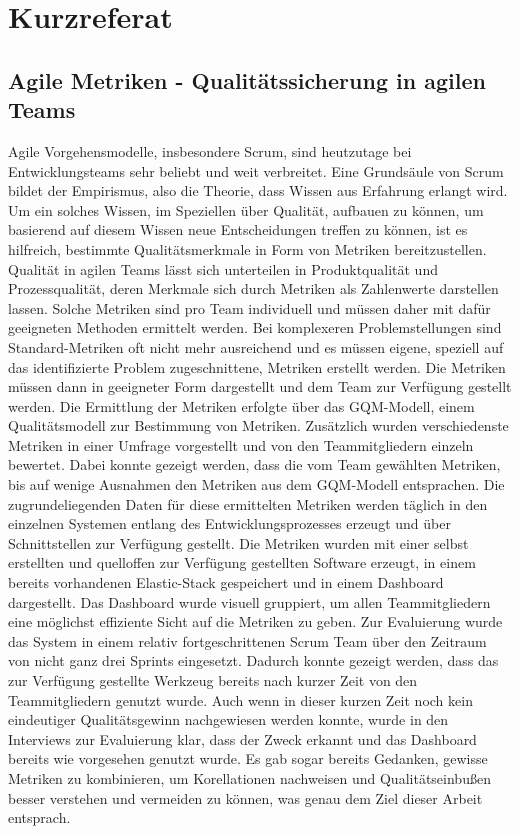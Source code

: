 \newpage
\chapter*{Kurzreferat}
\section*{Agile Metriken {-} Qualitätssicherung in agilen Teams}

Agile Vorgehensmodelle, insbesondere Scrum, sind heutzutage bei Entwicklungsteams sehr beliebt und weit verbreitet.
Eine Grundsäule von Scrum bildet der Empirismus, also die Theorie, dass Wissen aus Erfahrung erlangt wird.
Um ein solches Wissen, im Speziellen über Qualität, aufbauen zu können, um basierend auf diesem Wissen neue Entscheidungen treffen zu können, ist es hilfreich, bestimmte Qualitätsmerkmale in Form von Metriken bereitzustellen.
Qualität in agilen Teams lässt sich unterteilen in Produktqualität und Prozessqualität, deren Merkmale sich durch Metriken als Zahlenwerte darstellen lassen.
Solche Metriken sind pro Team individuell und müssen daher mit dafür geeigneten Methoden ermittelt werden.
Bei komplexeren Problemstellungen sind Standard-Metriken oft nicht mehr ausreichend und es müssen eigene, speziell auf das identifizierte Problem zugeschnittene, Metriken erstellt werden.
Die Metriken müssen dann in geeigneter Form dargestellt und dem Team zur Verfügung gestellt werden.
Die Ermittlung der Metriken erfolgte über das \ac{GQM}-Modell, einem Qualitätsmodell zur Bestimmung von Metriken.
Zusätzlich wurden verschiedenste Metriken in einer Umfrage vorgestellt und von den Teammitgliedern einzeln bewertet.
Dabei konnte gezeigt werden, dass die vom Team gewählten Metriken, bis auf wenige Ausnahmen den Metriken aus dem \ac{GQM}-Modell entsprachen.
Die zugrundeliegenden Daten für diese ermittelten Metriken werden täglich in den einzelnen Systemen entlang des Entwicklungsprozesses erzeugt und über Schnittstellen zur Verfügung gestellt.
Die Metriken wurden mit einer selbst erstellten und quelloffen zur Verfügung gestellten Software erzeugt, in einem bereits vorhandenen Elastic-Stack gespeichert und in einem Dashboard dargestellt.
Das Dashboard wurde visuell gruppiert, um allen Teammitgliedern eine möglichst effiziente Sicht auf die Metriken zu geben.
Zur Evaluierung wurde das System in einem relativ fortgeschrittenen Scrum Team über den Zeitraum von nicht ganz drei Sprints eingesetzt.
Dadurch konnte gezeigt werden, dass das zur Verfügung gestellte Werkzeug bereits nach kurzer Zeit von den Teammitgliedern genutzt wurde.
Auch wenn in dieser kurzen Zeit noch kein eindeutiger Qualitätsgewinn nachgewiesen werden konnte, wurde in den Interviews zur Evaluierung klar, dass der Zweck erkannt und das Dashboard bereits wie vorgesehen genutzt wurde.
Es gab sogar bereits Gedanken, gewisse Metriken zu kombinieren, um Korellationen nachweisen und Qualitätseinbußen besser verstehen und vermeiden zu können, was genau dem Ziel dieser Arbeit entsprach.

